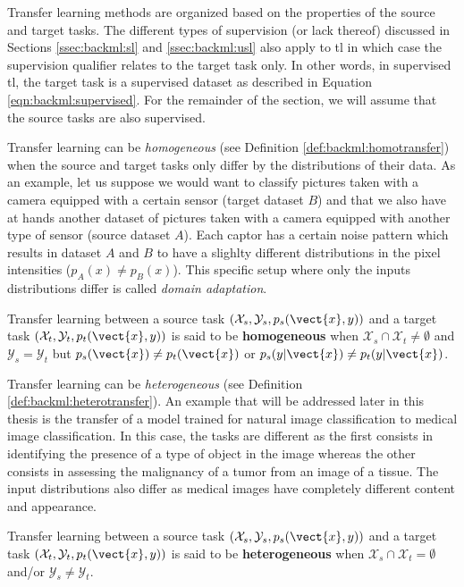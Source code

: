 Transfer learning methods are organized based on the properties of the source and
target tasks. The different types of supervision (or lack thereof) discussed in
Sections \ref{ssec:backml:sl} and \ref{ssec:backml:usl} also apply to \acrlong{tl}
in which case the supervision qualifier relates to the target task only. In other
words, in supervised \acrlong{tl}, the target task is a supervised dataset as
described in Equation \ref{eqn:backml:supervised}. For the remainder of the section,
we will assume that the source tasks are also supervised.

Transfer learning can be \textit{homogeneous} (see Definition \ref{def:backml:homotransfer})
when the source and target tasks only differ by the distributions of their data.
As an example, let us suppose we would want to classify pictures taken with a
camera equipped with a certain sensor (target dataset $B$) and that we also have
at hands another dataset of pictures taken with a camera equipped with another
type of sensor (source dataset $A$). Each captor has a certain noise pattern which
results in dataset $A$ and $B$ to have a slighlty different distributions in the
pixel intensities (\ie $p_A(x) \neq p_B(x)$). This specific setup where only the
inputs distributions differ is called \textit{domain adaptation}.

\begin{definition}
\label{def:backml:homotransfer}
Transfer learning between a source task $\left(\mathcal{X}_{s}, \mathcal{Y}_{s}, p_{s}(\vect{x}, y)\right)$ and a target task $\left(\mathcal{X}_t, \mathcal{Y}_t, p_t(\vect{x}, y)\right)$ is said to be \textbf{homogeneous} when $\mathcal{X}_s \cap \mathcal{X}_t \neq \emptyset$ and $\mathcal{Y}_s = \mathcal{Y}_t$ but $p_s(\vect{x}) \neq p_t(\vect{x})$ or $p_s(y|\vect{x}) \neq p_t(y|\vect{x})$.
\end{definition}

Transfer learning can be \textit{heterogeneous} (see Definition
\ref{def:backml:heterotransfer}). An example that will be addressed later in this
thesis is the transfer of a model trained for natural image classification to
medical image classification. In this case, the tasks are different as the first
consists in identifying the presence of a type of object in the image whereas the
other consists in assessing the malignancy of a tumor from an image of a tissue.
The input distributions also differ as medical images have completely different
content and appearance.

\begin{definition}
\label{def:backml:heterotransfer}
Transfer learning between a source task $\left(\mathcal{X}_{s}, \mathcal{Y}_{s}, p_{s}(\vect{x}, y)\right)$ and a target task $\left(\mathcal{X}_t, \mathcal{Y}_t, p_t(\vect{x}, y)\right)$ is said to be \textbf{heterogeneous} when $\mathcal{X}_s \cap \mathcal{X}_t = \emptyset$ and/or $\mathcal{Y}_s \neq \mathcal{Y}_t$.
\end{definition}

